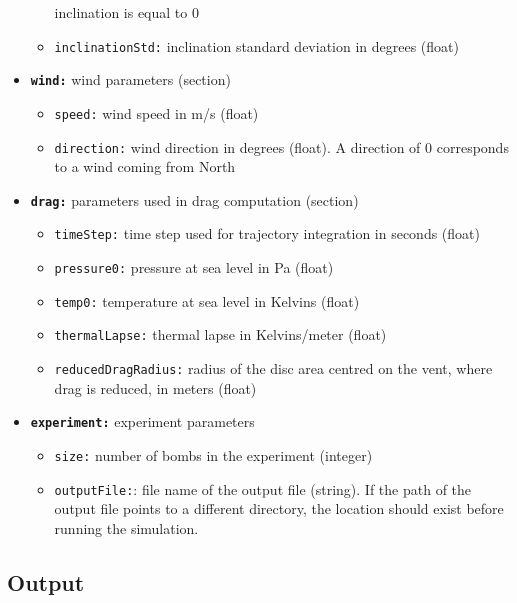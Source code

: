 \documentclass[10pt,a4paper]{article}
\begin{document}
\begin{itemize}
\begin{itemize}
	inclination is equal to 0
	\item \texttt{\textsf{\color{namecolor}inclinationStd:}} inclination standard deviation in degrees (float)
	\end{itemize}
\item \textbf{\texttt{\textsf{\color{namecolor}wind:}}} wind parameters (section)
	\begin{itemize}
	\item \texttt{\textsf{\color{namecolor}speed:}} wind speed in m/s (float)
	\item \texttt{\textsf{\color{namecolor}direction:}} wind direction in degrees (float). A direction of 0
	corresponds to a wind coming from North
	\end{itemize}
\item \textbf{\texttt{\textsf{\color{namecolor}drag:}}} parameters used in drag computation (section)
	\begin{itemize}
	\item \texttt{\textsf{\color{namecolor}timeStep:}} time step used for trajectory integration in seconds (float)
	\item \texttt{\textsf{\color{namecolor}pressure0:}} pressure at sea level in Pa (float)
	\item \texttt{\textsf{\color{namecolor}temp0:}} temperature at sea level in Kelvins (float)
	\item \texttt{\textsf{\color{namecolor}thermalLapse:}} thermal lapse in Kelvins/meter (float)
	\item \texttt{\textsf{\color{namecolor}reducedDragRadius:}} radius of the disc area centred on the vent,
	where drag is reduced, in meters (float)
	\end{itemize}
\item \textbf{\texttt{\textsf{\color{namecolor}experiment:}}} experiment parameters
	\begin{itemize}
	\item \texttt{\textsf{\color{namecolor}size:}} number of bombs in the experiment (integer)
	\item \texttt{\textsf{\color{namecolor}outputFile:}}: file name of the output file (string). If the path of the output file points to a different directory, the location should exist before running the simulation.
	\end{itemize}
\end{itemize}


\subsection{Output}
\label{sec-5}
\end{document}
